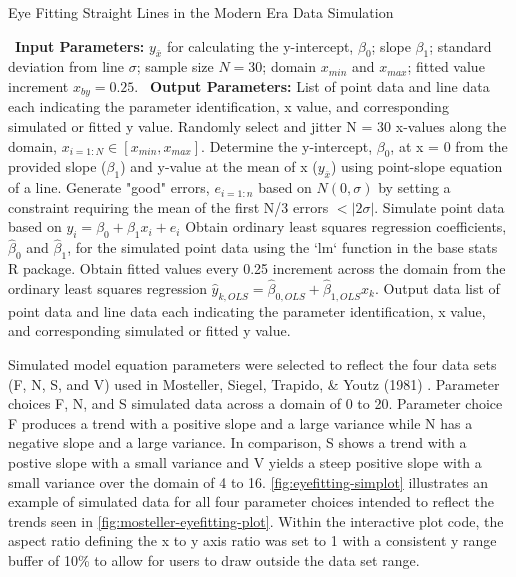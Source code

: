 \documentclass[print]{nuthesis}
\begin{document}
\begin{algorithm}
  \caption{Eye Fitting Straight Lines in the Modern Era Data Simulation}\label{alg:eyefitting-algorithm}
  \begin{algorithmic}[1]
    \Statex \textbullet~\textbf{Input Parameters:} $y_{\bar{x}}$ for calculating the y-intercept, $\beta_0$; slope $\beta_1$; standard deviation from line $\sigma$; sample size $N = 30$; domain $x_{min}$ and $x_{max}$; fitted value increment $x_{by} = 0.25$.
    \Statex \textbullet~\textbf{Output Parameters:} List of point data and line data each indicating the parameter identification, x value, and corresponding simulated or fitted y value.
    \State Randomly select and jitter N = 30 x-values along the domain, $x_{i=1:N}\in [x_{min}, x_{max}]$.
    \State Determine the y-intercept, $\beta_0$, at x = 0 from the provided slope ($\beta_1$) and y-value at the mean of x ($y_{\bar{x}}$) using point-slope equation of a line.
    \State Generate "good" errors, $e_{i = 1:n}$ based on $N(0,\sigma)$ by setting a constraint requiring the mean of the first N/3 errors $< |2\sigma|.$
    \State Simulate point data based on $y_i = \beta_0 + \beta_1 x_i + e_i$
    \State Obtain ordinary least squares regression coefficients, $\hat\beta_0$ and $\hat\beta_1$, for the simulated point data using the `lm` function in the base stats R package.
    \State Obtain fitted values every 0.25 increment across the domain from the ordinary least squares regression $\hat y_{k,OLS} = \hat\beta_{0,OLS} + \hat\beta_{1,OLS} x_k$.
    \State Output data list of point data and line data each indicating the parameter identification, x value, and corresponding simulated or fitted y value.
  \end{algorithmic}
\end{algorithm}

Simulated model equation parameters were selected to reflect the four data sets (F, N, S, and V) used in Mosteller, Siegel, Trapido, \& Youtz (1981) .
Parameter choices F, N, and S simulated data across a domain of 0 to 20.
Parameter choice F produces a trend with a positive slope and a large variance while N has a negative slope and a large variance.
In comparison, S shows a trend with a postive slope with a small variance and V yields a steep positive slope with a small variance over the domain of 4 to 16.
\cref{fig:eyefitting-simplot} illustrates an example of simulated data for all four parameter choices intended to reflect the trends seen in \cref{fig:mosteller-eyefitting-plot}.
Within the interactive plot code, the aspect ratio defining the x to y axis ratio was set to 1 with a consistent y range buffer of 10\% to allow for users to draw outside the data set range.
\end{document}
